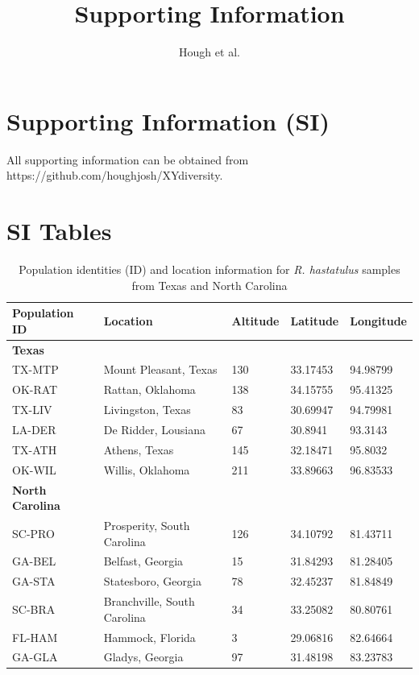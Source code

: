 \documentclass[9pt,onecolumn,twoside]{pnas-new}
\title{Supporting Information}
\author{Hough et al.}
\begin{document}
\maketitle

\section*{Supporting Information (SI)}

All supporting information can be obtained from https://github.com/houghjosh/XYdiversity.

\section*{SI Tables}

\begin{table}[tbhp!]
\centering
\caption{Population identities (ID) and location information for \textit{R. hastatulus} samples from Texas and North Carolina}
\begin{tabular}{lllll}
Population ID & Location & Altitude & Latitude & Longitude \\
\midrule
\textbf{Texas} &  &  &  &  \\
TX-MTP & Mount Pleasant, Texas & 130	 & 33.17453 & 94.98799 \\
OK-RAT & Rattan, Oklahoma & 138 & 34.15755 & 95.41325 \\
TX-LIV & Livingston, Texas & 83 & 30.69947 & 94.79981 \\ 
LA-DER & De Ridder, Lousiana & 67 & 30.8941 & 93.3143 \\
TX-ATH & Athens, Texas & 145 & 32.18471 & 95.8032 \\
OK-WIL & Willis, Oklahoma & 211 & 33.89663 & 96.83533 \\
\textbf{North Carolina} &  &  &  &  \\
SC-PRO & Prosperity, South Carolina & 126 & 34.10792 & 81.43711 \\
GA-BEL & Belfast, Georgia & 15 & 31.84293 & 81.28405 \\
GA-STA & Statesboro, Georgia & 78 & 32.45237 & 81.84849 \\
SC-BRA & Branchville, South Carolina & 	34 & 33.25082 & 80.80761 \\
FL-HAM & Hammock, Florida & 3 & 29.06816 & 82.64664 \\
GA-GLA & Gladys, Georgia	 & 97 & 31.48198 & 83.23783 \\
\bottomrule
\end{tabular}
\end{table}
\end{document}
